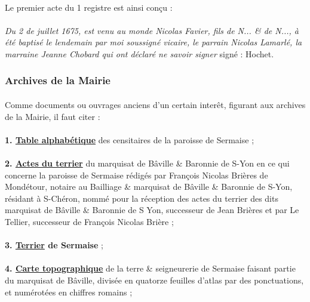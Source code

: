 \documentclass[../eBook.tex]{subfiles}
\begin{document}
      \paragraph{}Le premier acte du 1 registre est ainsi conçu :
      \paragraph{}\og \textit{Du 2 de juillet 1675, est venu au monde Nicolas Favier, fils de N... \& de N..., à été baptisé le lendemain par moi soussigné vicaire, le parrain Nicolas Lamarlé, la marraine Jeanne Chobard qui ont déclaré ne savoir signer} \fg{} signé : Hochet.

    \subsubsection*{Archives de la Mairie}
      \paragraph{}Comme documents ou ouvrages anciens d'un certain interêt, figurant aux archives de la Mairie, il faut citer :
      \paragraph{}\textbf{1. \underline{Table alphabétique}} des censitaires de la paroisse de Sermaise ;
      \paragraph{}\textbf{2. \underline{Actes du terrier}} du marquisat de Bâville \& Baronnie de S-Yon en ce qui concerne la paroisse de Sermaise rédigés par François Nicolas Brières de Mondétour, notaire au Bailliage \& marquisat de Bâville \& Baronnie de S-Yon, résidant à S-Chéron, nommé pour la réception des actes du terrier des dits marquisat de Bâville \& Baronnie de S Yon, successeur de Jean Brières et par Le Tellier, successeur de François Nicolas Brière ;
      \paragraph{}\textbf{3. \underline{Terrier} de Sermaise} ;
      \paragraph{}\textbf{4. \underline{Carte topographique}} de la terre \& seigneurerie de Sermaise faisant partie du marquisat de Bâville, divisée en quatorze feuilles d'atlas par des ponctuations, et numérotées en chiffres romains ;
\end{document}
